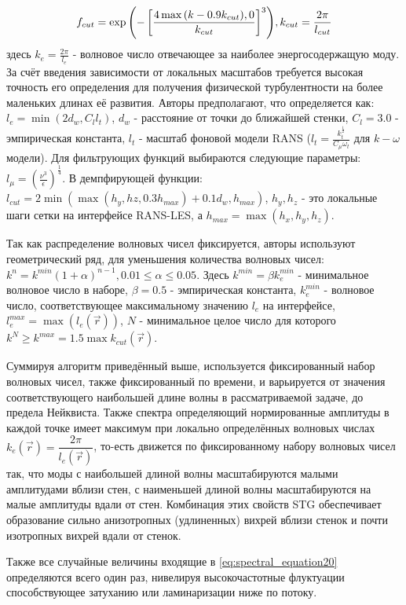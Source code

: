 \begin{equation}
    \label{eq:spectral_equation23_1}
    f_{cut} = \exp{\left(-\left[ \frac{4 \max{(k - 0.9 k_{cut}), 0}}{k_{cut}} \right]^3\right)},\\
    k_{cut} = \dfrac{2 \pi}{l_{cut}} 
\end{equation}
\noindent
здесь $k_e = \frac{2 \pi}{l_e}$ - волновое число отвечающее за наиболее энергосодержащую моду. За счёт введения зависимости от локальных масштабов требуется высокая точность его определения для получения физической турбулентности на более маленьких длинах её развития. Авторы предполагают, что определяется как: $l_e = \min{(2 d_w, C_l l_t)}$, $d_w$ - расстояние от точки до ближайшей стенки, $C_l = 3.0$ - эмпирическая константа, $l_t$ - масштаб фоновой модели RANS ($l_t = \frac{k_t^\frac{1}{2}}{C_\mu \omega_t}$ для  $k-\omega$ модели). Для фильтрующих функций выбираются следующие параметры: $l_\mu = (\frac{\nu^3}{\epsilon})^\frac{1}{4}$. В демпфирующей функции: $l_{cut} = 2 \min{(\max{(h_y, hz, 0.3 h_{max})} + 0.1 d_w, h_{max})}$, $h_y,h_z$ - это локальные шаги сетки на интерфейсе RANS-LES, а $h_{max}=\max{(h_x,h_y,h_z)}$.

Так как распределение волновых чисел фиксируется, авторы используют геометрический ряд, для уменьшения количества волновых чисел: $k^n = k^{min}(1 + \alpha)^{n -1}, 0.01 \leq \alpha \leq 0.05$. Здесь $k^{min} = \beta k^{min}_e$ - минимальное волновое число в наборе, $\beta = 0.5$ - эмпирическая константа, $k^{min}_e$ - волновое число, соответствующее максимальному значению $l_e$ на интерфейсе, $l_e^{max} = \max{(l_e(\vec r))}$, $N$ - минимальное целое число для которого $k^N \geq k^{max} = 1.5 \max{k_{cut}(\vec r)}$. 

Суммируя алгоритм приведённый выше, используется фиксированный набор волновых чисел, также фиксированный по времени, и варьируется от значения соответствующего наибольшей длине волны в рассматриваемой задаче, до предела Нейквиста. Также спектра определяющий нормированные амплитуды в каждой точке имеет максимум при локально определённых волновых числах $k_e(\vec r) =\dfrac{2 \pi}{l_e(\vec r)}$, то-есть движется по фиксированному набору волновых чисел так, что моды с наибольшей длиной волны масштабируются малыми амплитудами вблизи стен, с наименьшей длиной волны масштабируются на малые амплитуды вдали от стен. Комбинация этих свойств STG обеспечивает образование сильно анизотропных (удлиненных) вихрей вблизи стенок и почти изотропных вихрей вдали от стенок.

Также все случайные величины входящие в \eqref{eq:spectral_equation20} определяются всего один раз, нивелируя высокочастотные флуктуации способствующее затуханию или ламинаризации ниже по потоку.
